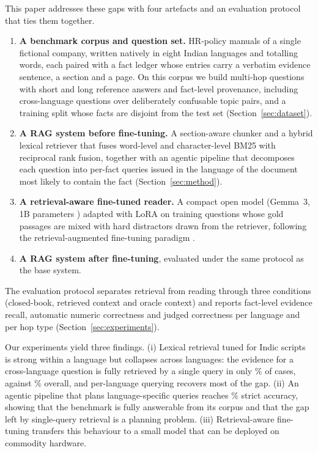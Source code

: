 \documentclass[preprint,12pt]{elsarticle}
\begin{document}
This paper addresses these gaps with four artefacts and an evaluation protocol that ties them together.
\begin{enumerate}
\item \textbf{A benchmark corpus and question set.} \NDocs{} HR-policy manuals of a single fictional company, written natively in eight Indian languages and totalling \NWords{} words, each paired with a fact ledger whose entries carry a verbatim evidence sentence, a section and a page. On this corpus we build \NTest{} multi-hop questions with short and long reference answers and fact-level provenance, including \NCrossLang{} cross-language questions over deliberately confusable topic pairs, and a training split whose facts are disjoint from the test set (Section~\ref{sec:dataset}).
\item \textbf{A RAG system before fine-tuning.} A section-aware chunker and a hybrid lexical retriever that fuses word-level and character-level BM25 with reciprocal rank fusion, together with an agentic pipeline that decomposes each question into per-fact queries issued in the language of the document most likely to contain the fact (Section~\ref{sec:method}).
\item \textbf{A retrieval-aware fine-tuned reader.} A compact open model (Gemma~3, 1B parameters \cite{gemma3}) adapted with LoRA \cite{hu2022lora} on training questions whose gold passages are mixed with hard distractors drawn from the retriever, following the retrieval-augmented fine-tuning paradigm \cite{zhang2024raft}.
\item \textbf{A RAG system after fine-tuning}, evaluated under the same protocol as the base system.
\end{enumerate}
The evaluation protocol separates retrieval from reading through three conditions (closed-book, retrieved context and oracle context) and reports fact-level evidence recall, automatic numeric correctness and judged correctness per language and per hop type (Section~\ref{sec:experiments}).

Our experiments yield three findings. (i) Lexical retrieval tuned for Indic scripts is strong within a language but collapses across languages: the evidence for a cross-language question is fully retrieved by a single query in only \RXLTen\% of cases, against \RAllTen\% overall, and per-language querying recovers most of the gap. (ii) An agentic pipeline that plans language-specific queries reaches \AStrict\% strict accuracy, showing that the benchmark is fully answerable from its corpus and that the gap left by single-query retrieval is a planning problem. (iii) Retrieval-aware fine-tuning transfers this behaviour to a small model that can be deployed on commodity hardware.
\end{document}

